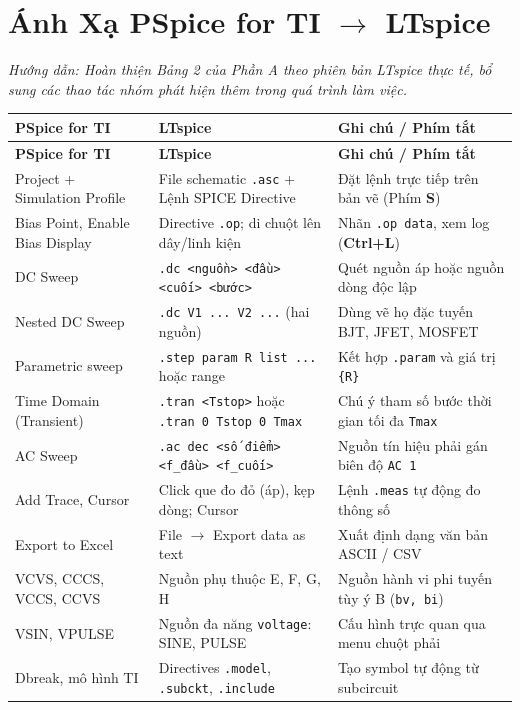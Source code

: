 \documentclass[12pt,a4paper]{report}
\begin{document}
\chapter{Ánh Xạ PSpice for TI $\to$ LTspice}

\textit{\color{guidegray}
Hướng dẫn: Hoàn thiện Bảng 2 của Phần A theo phiên bản LTspice thực tế, bổ sung các thao tác nhóm phát hiện thêm trong quá trình làm việc.
}

\begin{orangebox}
\begin{longtable}{|p{3.8cm}|p{5.5cm}|p{5.5cm}|}
\hline
\rowcolor{codebg}
\textbf{PSpice for TI} & \textbf{LTspice} & \textbf{Ghi chú / Phím tắt} \\ \hline
\endfirsthead
\hline
\rowcolor{codebg}
\textbf{PSpice for TI} & \textbf{LTspice} & \textbf{Ghi chú / Phím tắt} \\ \hline
\endhead
\hline
\endfoot
Project + Simulation Profile & File schematic \texttt{.asc} + Lệnh SPICE Directive & Đặt lệnh trực tiếp trên bản vẽ (Phím \textbf{S}) \\ \hline
Bias Point, Enable Bias Display & Directive \lstinline|.op|; di chuột lên dây/linh kiện & Nhãn \lstinline|.op data|, xem log (\textbf{Ctrl+L}) \\ \hline
DC Sweep & \lstinline|.dc <nguồn> <đầu> <cuối> <bước>| & Quét nguồn áp hoặc nguồn dòng độc lập \\ \hline
Nested DC Sweep & \lstinline|.dc V1 ... V2 ...| (hai nguồn) & Dùng vẽ họ đặc tuyến BJT, JFET, MOSFET \\ \hline
Parametric sweep & \lstinline|.step param R list ...| hoặc range & Kết hợp \lstinline|.param| và giá trị \lstinline|{R}| \\ \hline
Time Domain (Transient) & \lstinline|.tran <Tstop>| hoặc \lstinline|.tran 0 Tstop 0 Tmax| & Chú ý tham số bước thời gian tối đa \texttt{Tmax} \\ \hline
AC Sweep & \lstinline|.ac dec <số điểm> <f_đầu> <f_cuối>| & Nguồn tín hiệu phải gán biên độ \lstinline|AC 1| \\ \hline
Add Trace, Cursor & Click que đo đỏ (áp), kẹp dòng; Cursor & Lệnh \lstinline|.meas| tự động đo thông số \\ \hline
Export to Excel & File $\to$ Export data as text & Xuất định dạng văn bản ASCII / CSV \\ \hline
VCVS, CCCS, VCCS, CCVS & Nguồn phụ thuộc E, F, G, H & Nguồn hành vi phi tuyến tùy ý B (\lstinline|bv, bi|) \\ \hline
VSIN, VPULSE & Nguồn đa năng \lstinline|voltage|: SINE, PULSE & Cấu hình trực quan qua menu chuột phải \\ \hline
Dbreak, mô hình TI & Directives \lstinline|.model|, \lstinline|.subckt|, \lstinline|.include| & Tạo symbol tự động từ subcircuit \\ \hline
\end{longtable}
\end{orangebox}
\end{document}

